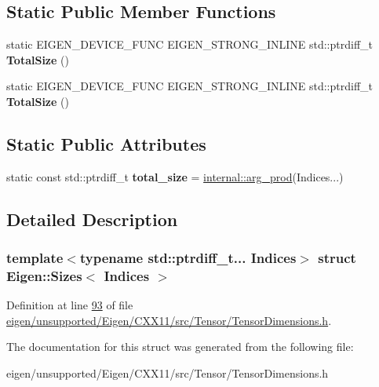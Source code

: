 \subsection*{Static Public Member Functions}
\begin{DoxyCompactItemize}
\item 
\mbox{\label{struct_eigen_1_1_sizes_a2310e554fd6cd43f16670ad44a3cd7f0}} 
static E\+I\+G\+E\+N\+\_\+\+D\+E\+V\+I\+C\+E\+\_\+\+F\+U\+NC E\+I\+G\+E\+N\+\_\+\+S\+T\+R\+O\+N\+G\+\_\+\+I\+N\+L\+I\+NE std\+::ptrdiff\+\_\+t {\bfseries Total\+Size} ()
\item 
\mbox{\label{struct_eigen_1_1_sizes_a2310e554fd6cd43f16670ad44a3cd7f0}} 
static E\+I\+G\+E\+N\+\_\+\+D\+E\+V\+I\+C\+E\+\_\+\+F\+U\+NC E\+I\+G\+E\+N\+\_\+\+S\+T\+R\+O\+N\+G\+\_\+\+I\+N\+L\+I\+NE std\+::ptrdiff\+\_\+t {\bfseries Total\+Size} ()
\end{DoxyCompactItemize}
\subsection*{Static Public Attributes}
\begin{DoxyCompactItemize}
\item 
\mbox{\label{struct_eigen_1_1_sizes_aac9d168da923f217558327ef05a1fd4d}} 
static const std\+::ptrdiff\+\_\+t {\bfseries total\+\_\+size} = \hyperlink{struct_eigen_1_1internal_1_1arg__prod}{internal\+::arg\+\_\+prod}(Indices...)
\end{DoxyCompactItemize}


\subsection{Detailed Description}
\subsubsection*{template$<$typename std\+::ptrdiff\+\_\+t... Indices$>$\newline
struct Eigen\+::\+Sizes$<$ Indices $>$}



Definition at line \hyperlink{eigen_2unsupported_2_eigen_2_c_x_x11_2src_2_tensor_2_tensor_dimensions_8h_source_l00093}{93} of file \hyperlink{eigen_2unsupported_2_eigen_2_c_x_x11_2src_2_tensor_2_tensor_dimensions_8h_source}{eigen/unsupported/\+Eigen/\+C\+X\+X11/src/\+Tensor/\+Tensor\+Dimensions.\+h}.



The documentation for this struct was generated from the following file\+:\begin{DoxyCompactItemize}
\item 
eigen/unsupported/\+Eigen/\+C\+X\+X11/src/\+Tensor/\+Tensor\+Dimensions.\+h\end{DoxyCompactItemize}
